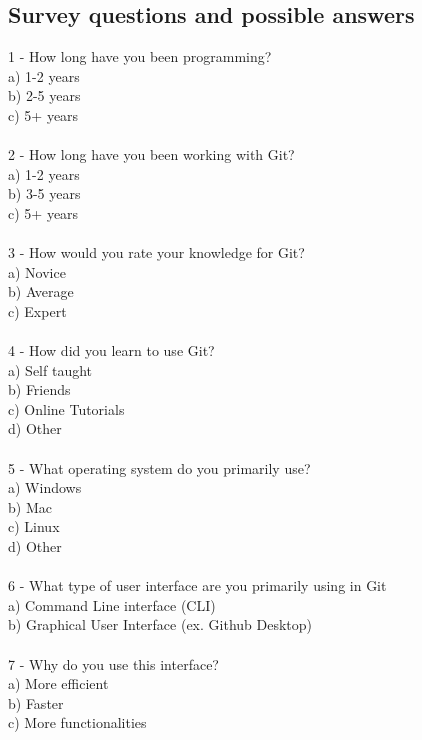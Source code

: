 \documentclass[]{report}
\begin{document}
	
	
	
	
	\subsection{Survey questions and possible answers}
	1 - How long have you been programming?\\
		a) 1-2 years\\
		b) 2-5 years\\
		c) 5+ years\\\\
	2 - How long have you been working with Git?\\
	a) 1-2 years\\
	b) 3-5 years\\
	c) 5+ years\\\\
	3 - How would you rate your knowledge for Git?\\
	a) Novice\\
	b) Average\\
	c) Expert\\\\
	4 - How did you learn to use Git?\\
	a) Self taught\\
	b) Friends\\
	c) Online Tutorials\\
	d) Other\\\\
	5 - What operating system do you primarily use?\\
	a) Windows\\
	b) Mac\\
	c) Linux\\
	d) Other\\\\
	6 - What type of user interface are you primarily using in Git\\
	a) Command Line interface (CLI)\\
	b) Graphical User Interface (ex. Github Desktop)\\\\
	7 - Why do you use this interface?\\
	a) More efficient\\
	b) Faster\\
	c) More functionalities\\
\end{document}

